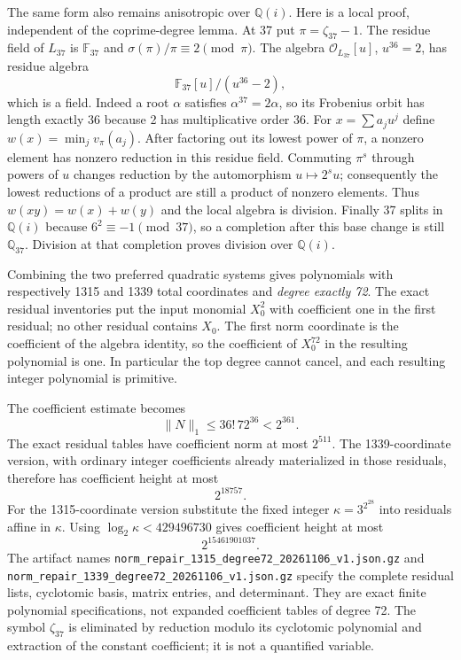 The same form also remains anisotropic over $\mathbb Q(i)$.
Here is a local proof, independent of the coprime-degree lemma.
At 37 put $\pi=\zeta_{37}-1$.  The residue field of
$L_{37}$ is $\mathbb F_{37}$ and
$\sigma(\pi)/\pi\equiv2\pmod\pi$.
The algebra $\mathcal O_{L_{37}}[u]$, $u^{36}=2$, has residue
algebra
\[
                    \mathbb F_{37}[u]/(u^{36}-2),
\]
which is a field.  Indeed a root $\alpha$ satisfies
$\alpha^{37}=2\alpha$, so its Frobenius orbit has length
exactly 36 because 2 has multiplicative order 36.
For $x=\sum a_j u^j$ define $w(x)=\min_j v_\pi(a_j)$.
After factoring out its lowest power of $\pi$, a nonzero
element has nonzero reduction in this residue field.
Commuting $\pi^s$ through powers of $u$ changes reduction
by the automorphism $u\mapsto2^su$; consequently the lowest
reductions of a product are still a product of nonzero
elements.  Thus $w(xy)=w(x)+w(y)$ and the local algebra
is division.  Finally 37 splits in $\mathbb Q(i)$ because
$6^2\equiv-1\pmod{37}$, so a completion after this base
change is still $\mathbb Q_{37}$.  Division at that completion
proves division over $\mathbb Q(i)$.

Combining the two preferred quadratic systems gives polynomials
with respectively 1315 and 1339 total coordinates and
\emph{degree exactly 72}.  The exact residual inventories put
the input monomial $X_0^2$ with coefficient one in the first
residual; no other residual contains $X_0$.  The first norm
coordinate is the coefficient of the algebra identity, so the
coefficient of $X_0^{72}$ in the resulting polynomial is one.
In particular the top degree cannot cancel, and each resulting
integer polynomial is primitive.

The coefficient estimate becomes
\[
                      \|N\|_1\le36!\,72^{36}<2^{361}.
\]
The exact residual tables have coefficient norm at most
$2^{511}$.  The 1339-coordinate version, with ordinary
integer coefficients already materialized in those residuals,
therefore has coefficient height at most
\[
                              2^{18757}.
\]
For the 1315-coordinate version substitute the fixed integer
$\kappa=3^{2^{28}}$ into residuals affine in $\kappa$.
Using $\log_2\kappa<429496730$ gives coefficient height at
most
\[
                              2^{15461901037}.
\]
The artifact names
\texttt{norm\_repair\_1315\_degree72\_20261106\_v1.json.gz}
and
\texttt{norm\_repair\_1339\_degree72\_20261106\_v1.json.gz}
specify the complete residual lists, cyclotomic basis,
matrix entries, and determinant.  They are exact finite
polynomial specifications, not expanded coefficient tables
of degree 72.  The symbol $\zeta_{37}$ is eliminated by
reduction modulo its cyclotomic polynomial and extraction
of the constant coefficient; it is not a quantified variable.


